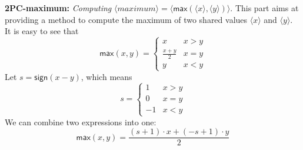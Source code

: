 \documentclass[letterpaper]{article} %
\begin{document}
    \textbf{2PC-maximum:}
    \emph{Computing} $ \langle maximum\rangle  = \langle \mathsf{max}(\langle x\rangle,\langle y\rangle)\rangle $.
       This part aims at providing a method to compute the maximum of two shared values $\langle x \rangle$ and $\langle y \rangle$.
       It is easy to see that
       $$\mathsf{max}(x,y) = \left\{\begin{matrix}
           x & x>y\\
           \frac{x+ y}{2} & x=y\\
           y & x<y
           \end{matrix}\right.$$
       Let $s = \mathsf{sign}(x-y)$, which means
       $$s = \left\{\begin{matrix}
           1 & x>y\\
           0 & x=y\\
           -1 & x<y
           \end{matrix}\right.$$
       We can combine two expressions into one:
       $$\mathsf{max}(x,y) = \frac{(s+1)\cdot x+ (-s+1)\cdot y}{2}$$
\end{document}

